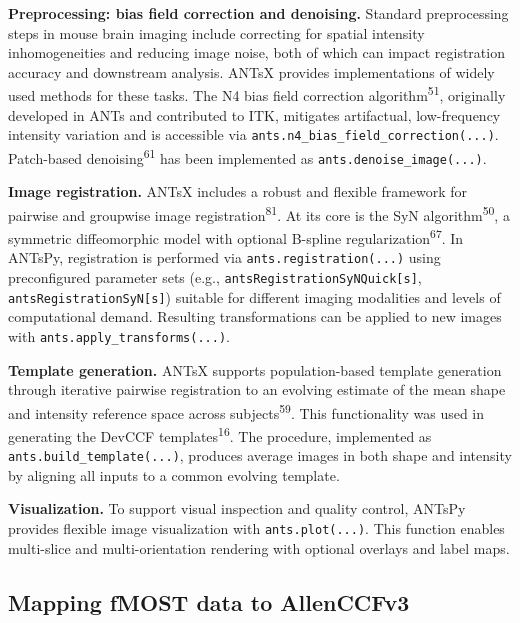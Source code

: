 \documentclass[
  12pt,
]{article}
\begin{document}


\textbf{Preprocessing: bias field correction and denoising.} Standard
preprocessing steps in mouse brain imaging include correcting for
spatial intensity inhomogeneities and reducing image noise, both of
which can impact registration accuracy and downstream analysis. ANTsX
provides implementations of widely used methods for these tasks. The N4
bias field correction algorithm\textsuperscript{51}, originally
developed in ANTs and contributed to ITK, mitigates artifactual,
low-frequency intensity variation and is accessible via
\texttt{ants.n4\_bias\_field\_correction(...)}. Patch-based
denoising\textsuperscript{61} has been implemented as
\texttt{ants.denoise\_image(...)}.

\textbf{Image registration.} ANTsX includes a robust and flexible
framework for pairwise and groupwise image
registration\textsuperscript{81}. At its core is the SyN
algorithm\textsuperscript{50}, a symmetric diffeomorphic model with
optional B-spline regularization\textsuperscript{67}. In ANTsPy,
registration is performed via \texttt{ants.registration(...)} using
preconfigured parameter sets (e.g.,
\texttt{antsRegistrationSyNQuick{[}s{]}},
\texttt{antsRegistrationSyN{[}s{]}}) suitable for different imaging
modalities and levels of computational demand. Resulting transformations
can be applied to new images with \texttt{ants.apply\_transforms(...)}.

\textbf{Template generation.} ANTsX supports population-based template
generation through iterative pairwise registration to an evolving
estimate of the mean shape and intensity reference space across
subjects\textsuperscript{59}. This functionality was used in generating
the DevCCF templates\textsuperscript{16}. The procedure, implemented as
\texttt{ants.build\_template(...)}, produces average images in both
shape and intensity by aligning all inputs to a common evolving
template.

\textbf{Visualization.} To support visual inspection and quality
control, ANTsPy provides flexible image visualization with
\texttt{ants.plot(...)}. This function enables multi-slice and
multi-orientation rendering with optional overlays and label maps.

\subsection{Mapping fMOST data to
AllenCCFv3}\label{mapping-fmost-data-to-allenccfv3}
\end{document}
